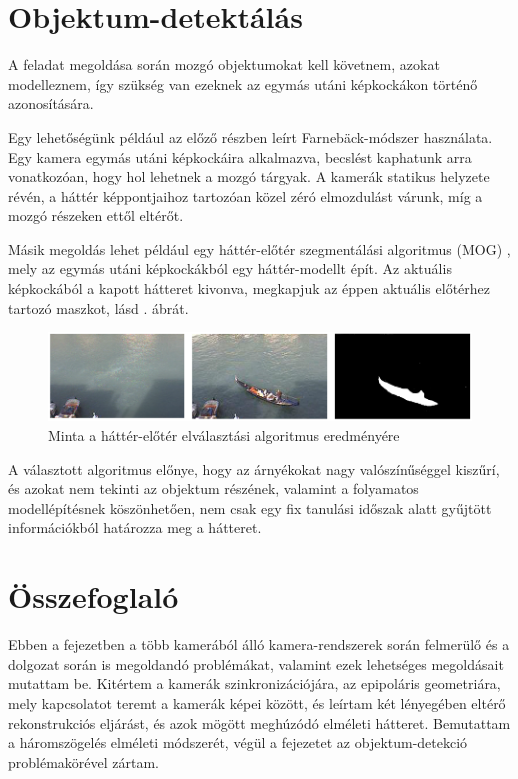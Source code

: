 \section{Objektum-detektálás \label{sec:obj_detection}}


A feladat megoldása során mozgó objektumokat kell követnem, azokat modelleznem, így szükség van ezeknek az egymás utáni képkockákon történő azonosítására.

Egy lehetőségünk például az előző részben leírt Farnebäck-módszer használata. Egy kamera egymás utáni képkockáira alkalmazva, becslést kaphatunk arra vonatkozóan, hogy hol lehetnek a mozgó tárgyak. A kamerák statikus helyzete révén, a háttér képpontjaihoz tartozóan közel zéró elmozdulást várunk, míg a mozgó részeken ettől eltérőt.

Másik megoldás lehet például egy háttér-előtér szegmentálási algoritmus (MOG) \cite{MOG}, mely az egymás utáni képkockákból egy háttér-modellt épít. Az aktuális képkockából a kapott hátteret kivonva, megkapjuk az éppen aktuális előtérhez tartozó maszkot, lásd . ábrát.

\begin{figure}[tbh]
\centering
\includegraphics{figures/mog.png}
\caption{Minta a háttér-előtér elválasztási algoritmus eredményére \cite{mog-example} \label{fig:mog-example}}
\end{figure}

A választott algoritmus előnye, hogy az árnyékokat nagy valószínűséggel kiszűrí, és azokat nem tekinti az objektum részének, valamint a folyamatos modellépítésnek köszönhetően, nem csak egy fix tanulási időszak alatt gyűjtött információkból határozza meg a hátteret.


\section{Összefoglaló}

Ebben a fejezetben a több kamerából álló kamera-rendszerek során felmerülő és a dolgozat során is megoldandó problémákat, valamint ezek lehetséges megoldásait mutattam be. Kitértem a kamerák szinkronizációjára, az epipoláris geometriára, mely kapcsolatot teremt a kamerák képei között, és leírtam két lényegében eltérő rekonstrukciós eljárást, és azok mögött meghúzódó elméleti hátteret. Bemutattam a háromszögelés elméleti módszerét, végül a fejezetet az objektum-detekció problémakörével zártam.